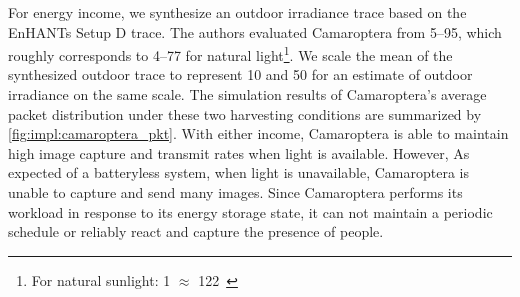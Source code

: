 For energy income, we synthesize an outdoor irradiance trace based on the EnHANTs Setup D trace. 
The authors evaluated Camaroptera from 5--95\ssi{\kilo\lux}, which roughly corresponds to 4--77\ssi[per-mode=symbol]{\milli\watt\per\centi\meter\squared} for natural light\footnote{For natural sunlight: 1\ssi[per-mode=symbol]{\watt\per\meter\squared} $\approx$ 
122\ssi{\lux}~\cite{michael2020conversion}}.
We scale the mean of the synthesized outdoor trace to represent 10 and 50\ssi[per-mode=symbol]{\milli\watt\per\centi\meter\squared} for an estimate of outdoor irradiance on the same scale.
The simulation results of Camaroptera's average packet distribution under these two harvesting conditions are summarized by \cref{fig:impl:camaroptera_pkt}.
With either income, Camaroptera is able to maintain high image capture and transmit rates when light is available. However, 
As expected of a batteryless system, when light is unavailable, Camaroptera is unable to capture and send many images.
Since Camaroptera performs its workload in response to its energy storage state, it can not maintain a periodic schedule or reliably react and capture the presence of people.


